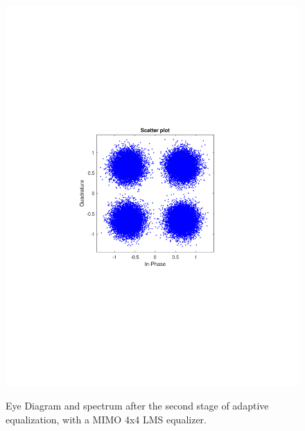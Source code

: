 \begin{refsection}
\begin{figure}[H]
\begin{minipage}{0.30\textwidth}
		\includegraphics[clip, trim=4cm 8cm 4cm 8cm, width=1\textwidth]{./sdf/m_qam_system/figures/expResults/homodyne/6_const_4GBdInSig13dBc_AfMIMO2.pdf}
		\label{fig:4GBdSpecBefFec}
	\end{minipage}
	\caption{Eye Diagram and spectrum after the second stage of adaptive equalization, with a MIMO 4x4 LMS equalizer.}
\end{figure}


\end{refsection}
